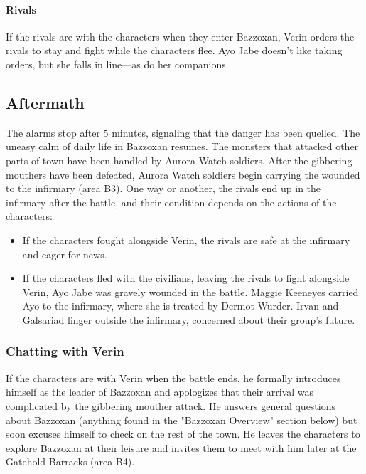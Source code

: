 \documentclass[10pt,a4,twoside,twocolumn,openany,nodeprecatedcode]{dndbook}
\begin{document}
\paragraph{Rivals}
If the rivals are with the characters when they enter Bazzoxan, Verin orders the rivals to stay and fight while the characters flee. Ayo Jabe doesn't like taking orders, but she falls in line—as do her companions.
\subsection{Aftermath}
The alarms stop after 5 minutes, signaling that the danger has been quelled. The uneasy calm of daily life in Bazzoxan resumes. The monsters that attacked other parts of town have been handled by Aurora Watch soldiers.
After the gibbering mouthers have been defeated, Aurora Watch soldiers begin carrying the wounded to the infirmary (area B3). One way or another, the rivals end up in the infirmary after the battle, and their condition depends on the actions of the characters:
\begin{itemize}

\item If the characters fought alongside Verin, the rivals are safe at the infirmary and eager for news.
\item If the characters fled with the civilians, leaving the rivals to fight alongside Verin, Ayo Jabe was gravely wounded in the battle. Maggie Keeneyes carried Ayo to the infirmary, where she is treated by Dermot Wurder. Irvan and Galsariad linger outside the infirmary, concerned about their group's future.
\end{itemize}


\subsubsection{Chatting with Verin}
If the characters are with Verin when the battle ends, he formally introduces himself as the leader of Bazzoxan and apologizes that their arrival was complicated by the gibbering mouther attack. He answers general questions about Bazzoxan (anything found in the "Bazzoxan Overview" section below) but soon excuses himself to check on the rest of the town. He leaves the characters to explore Bazzoxan at their leisure and invites them to meet with him later at the Gatehold Barracks (area B4).
\end{document}
